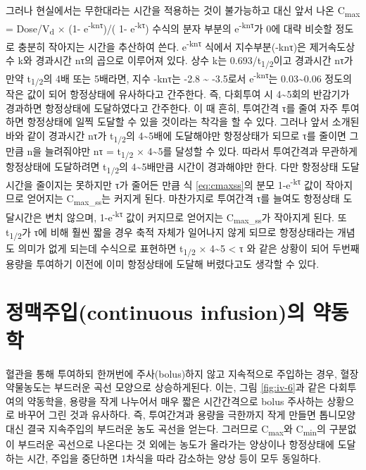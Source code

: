 \documentclass[
  11pt,
  krantz2, a4paper, twoside]{krantz}
\theoremstyle{definition}
\theoremstyle{definition}
\theoremstyle{definition}
\theoremstyle{definition}
\theoremstyle{remark}
\begin{document}
그러나 현실에서는 무한대라는 시간을 적용하는 것이 불가능하고 대신 앞서 나온 C\textsubscript{max} = Dose/V\textsubscript{d} × (1- e\textsuperscript{-knτ})/( 1- e\textsuperscript{-kτ}) 수식의 분자 부분의 e\textsuperscript{-knτ}가 0에 대략 비슷할 정도로 충분히 작아지는 시간을 추산하여 쓴다.
e\textsuperscript{-knτ} 식에서 지수부분(-knτ)은 제거속도상수 k와 경과시간 nτ의 곱으로 이루어져 있다.
상수 k는 0.693/t\textsubscript{1/2}이고 경과시간 nτ가 만약 t\textsubscript{1/2}의 4배 또는 5배라면, 지수 -knτ는 -2.8 \textasciitilde{} -3.5로서 e\textsuperscript{-knτ}는 0.03\textasciitilde0.06 정도의 작은 값이 되어 항정상태에 유사하다고 간주한다. 
즉, 다회투여 시 4\textasciitilde5회의 반감기가 경과하면 항정상태에 도달하였다고 간주한다. 
이 때 흔히, 투여간격 τ를 줄여 자주 투여하면 항정상태에 일찍 도달할 수 있을 것이라는 착각을 할 수 있다. 
그러나 앞서 소개된 바와 같이 경과시간 nτ가 t\textsubscript{1/2}의 4\textasciitilde5배에 도달해야만 항정상태가 되므로 τ를 줄이면 그만큼 n을 늘려줘야만 nτ = t\textsubscript{1/2} × 4\textasciitilde5를 달성할 수 있다. 따라서 투여간격과 무관하게 항정상태에 도달하려면 t\textsubscript{1/2}의 4\textasciitilde5배만큼 시간이 경과해야만 한다. 
다만 항정상태 도달시간을 줄이지는 못하지만 τ가 줄어든 만큼 식 \eqref{eq:cmaxss}의 분모 1-e\textsuperscript{-kτ} 값이 작아지므로 얻어지는 C\textsubscript{max\_ss}는 커지게 된다. 
마찬가지로 투여간격 τ를 늘여도 항정상태 도달시간은 변치 않으며, 1-e\textsuperscript{-kτ} 값이 커지므로 얻어지는 C\textsubscript{max\_ss}가 작아지게 된다. 
또 t\textsubscript{1/2}가 τ에 비해 훨씬 짧을 경우 축적 자체가 일어나지 않게 되므로 항정상태라는 개념도 의미가 없게 되는데 수식으로 표현하면 t\textsubscript{1/2} × 4\textasciitilde5 \textless{} τ 와 같은 상황이 되어 두번째 용량을 투여하기 이전에 이미 항정상태에 도달해 버렸다고도 생각할 수 있다.

\section{\texorpdfstring{정맥주입(continuous infusion)의 약동학}{정맥주입(continuous infusion)의 약동학}}\label{uxc815uxb9e5uxc8fcuxc785continuous-infusionuxc758-uxc57duxb3d9uxd559}

혈관을 통해 투여하되 한꺼번에 주사(bolus)하지 않고 지속적으로 주입하는
경우, 혈장약물농도는 부드러운 곡선 모양으로 상승하게된다. 이는, 그림 \ref{fig:iv-6}과 같은 다회투여의 약동학을, 용량을 작게 나누어서 매우 짧은
시간간격으로 bolus 주사하는 상황으로 바꾸어 그린 것과 유사하다.
즉, 투여간겨과 용량을 극한까지 작게 만들면 톱니모양 대신 결국 지속주입의 부드러운 농도 곡선을 얻는다.
그러므로 C\textsubscript{max}와 C\textsubscript{min}의
구분없이 부드러운 곡선으로 나온다는 것 외에는 농도가 올라가는 양상이나
항정상태에 도달하는 시간, 주입을 중단하면 1차식을 따라 감소하는 양상
등이 모두 동일하다.
\end{document}
